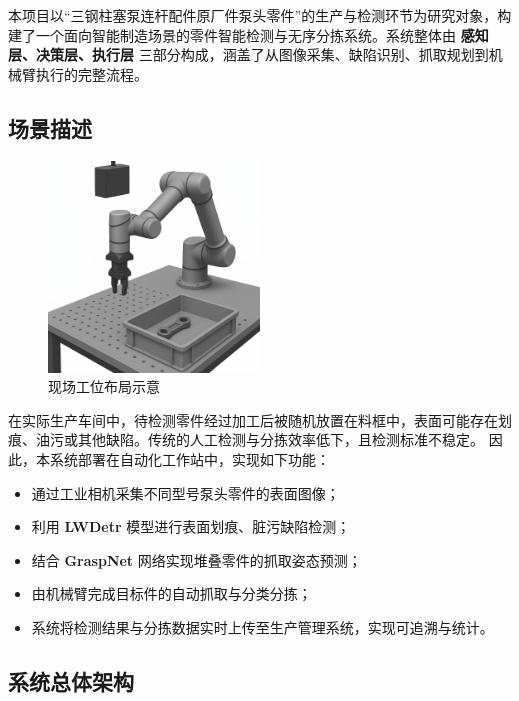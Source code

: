 \documentclass{cumcmthesis}
\begin{document}
本项目以“三钢柱塞泵连杆配件原厂件泵头零件”的生产与检测环节为研究对象，构建了一个面向智能制造场景的零件智能检测与无序分拣系统。系统整体由 \textbf{感知层、决策层、执行层} 三部分构成，涵盖了从图像采集、缺陷识别、抓取规划到机械臂执行的完整流程。

\subsection{场景描述}

\begin{figure}[htbp]
    \centering
    \includegraphics[width=0.5\textwidth]{bg_rm.png}
    \caption{现场工位布局示意}\label{fig:cell_layout}
\end{figure}
在实际生产车间中，待检测零件经过加工后被随机放置在料框中，表面可能存在划痕、油污或其他缺陷。传统的人工检测与分拣效率低下，且检测标准不稳定。  
因此，本系统部署在自动化工作站中，实现如下功能：

\begin{itemize}
    \item 通过工业相机采集不同型号泵头零件的表面图像；
    \item 利用 \textbf{LWDetr} 模型进行表面划痕、脏污缺陷检测；
    \item 结合 \textbf{GraspNet} 网络实现堆叠零件的抓取姿态预测；
    \item 由机械臂完成目标件的自动抓取与分类分拣；
    \item 系统将检测结果与分拣数据实时上传至生产管理系统，实现可追溯与统计。
\end{itemize}

\subsection{系统总体架构}
\end{document}
